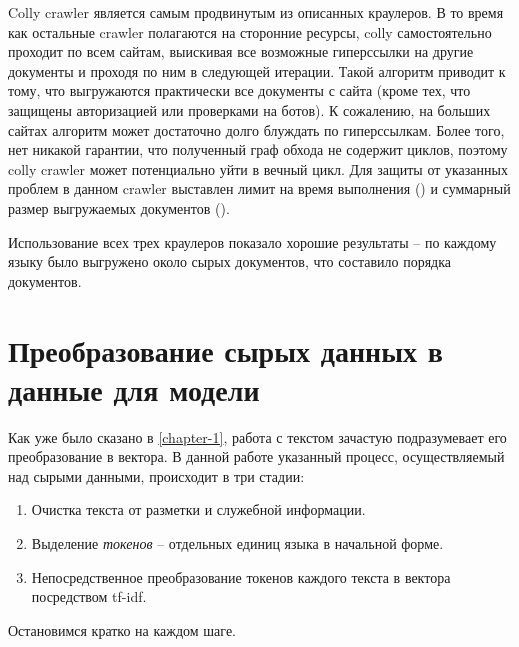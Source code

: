 Colly \gls{crawler} \cite{cite:colly} является самым продвинутым из описанных краулеров.
В то время как остальные \gls{crawler} полагаются на сторонние ресурсы, colly самостоятельно проходит по всем сайтам, выискивая все возможные гиперссылки на другие документы и проходя по ним в следующей итерации.
Такой алгоритм приводит к тому, что выгружаются практически все документы с сайта (кроме тех, что защищены авторизацией или проверками на ботов).
К сожалению, на больших сайтах алгоритм может достаточно долго блуждать по гиперссылкам.
Более того, нет никакой гарантии, что полученный граф обхода не содержит циклов, поэтому colly crawler может потенциально уйти в вечный цикл.
Для защиты от указанных проблем в данном \gls{crawler} выставлен лимит на время выполнения (\collyTimeLimit) и суммарный размер выгружаемых документов (\collySizeLimit).

Использование всех трех краулеров показало хорошие результаты -- по каждому языку было выгружено около \datasetSize сырых документов, что составило порядка \datasetDocs документов.

\section{Преобразование сырых данных в данные для модели}
\label{sec:preprocessing}
Как уже было сказано в \ref{chapter-1}, работа с текстом зачастую подразумевает его преобразование в вектора.
В данной работе указанный процесс, осуществляемый над сырыми данными, происходит в три стадии:
\begin{enumerate}
    \item Очистка текста от разметки и служебной информации.
    \item Выделение \textit{токенов} -- отдельных единиц языка в начальной форме.
    \item Непосредственное преобразование токенов каждого текста в вектора посредством \acrshort{tf-idf}.
\end{enumerate}
Остановимся кратко на каждом шаге.
